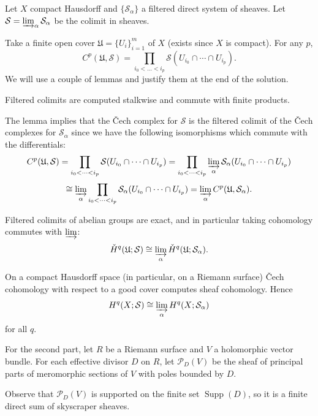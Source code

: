 \documentclass[12pt]{article}
\begin{document}
\begin{solution}
    Let $X$ compact Hausdorff and $\{\mathcal{S}_\alpha\}$ a filtered direct system of sheaves. Let $\mathcal{S} = \varinjlim_\alpha \mathcal{S}_\alpha$ be the colimit in sheaves.

    Take a finite open cover $\mathfrak{U} = \{U_i\}_{i=1}^m$ of $X$ (exists since $X$ is compact). For any $p$,
    \[
    C^p(\mathfrak{U},\mathcal{S}) = \prod_{i_0<\dots<i_p} \mathcal{S}(U_{i_0}\cap\cdots\cap U_{i_p}).
    \]
    We will use a couple of lemmas and justify them at the end of the solution.
    \begin{lemma}\label{lem:filtered-colim-stalkwise}
     Filtered colimits are computed stalkwise and commute with finite products.
    \end{lemma}
The lemma implies that the Čech complex for $\mathcal{S}$ is the filtered colimit of the Čech complexes for $\mathcal{S}_\alpha$ since we have the following isomorphisms which commute with the differentials:
    \[
    C^p(\mathfrak{U},\mathcal{S}) = \prod_{i_0<\dots<i_p} \mathcal{S}(U_{i_0}\cap\cdots\cap U_{i_p}) = \prod_{i_0<\dots<i_p} \varinjlim_\alpha \mathcal{S}_\alpha(U_{i_0}\cap\cdots\cap U_{i_p})
    \]
    \[
    \cong \varinjlim_\alpha \prod_{i_0<\dots<i_p} \mathcal{S}_\alpha(U_{i_0}\cap\cdots\cap U_{i_p}) = \varinjlim_\alpha C^p(\mathfrak{U},\mathcal{S}_\alpha).
    \]


    \begin{lemma}\label{lem:filtered-colim-exact}
    Filtered colimits of abelian groups are exact, and in particular taking cohomology commutes with $\varinjlim$:
    \[
    \check{H}^q(\mathfrak{U};\mathcal{S}) \cong \varinjlim_\alpha \check{H}^q(\mathfrak{U};\mathcal{S}_\alpha).
    \]
    \end{lemma}
    On a compact Hausdorff space (in particular, on a Riemann surface) Čech cohomology with respect to a good cover computes sheaf cohomology. Hence
    \[
    H^q(X;\mathcal{S}) \cong \varinjlim_\alpha H^q(X;\mathcal{S}_\alpha)
    \]
    for all $q$. 

    For the second part, let $R$ be a Riemann surface and $V$ a holomorphic vector bundle. For each effective divisor $D$ on $R$, let $\mathcal{P}_D(V)$ be the sheaf of principal parts of meromorphic sections of $V$ with poles bounded by $D$.

Observe that $\mathcal{P}_D(V)$ is supported on the finite set $\operatorname{Supp}(D)$, so it is a finite direct sum of skyscraper sheaves. 


\end{solution}
\end{document}
